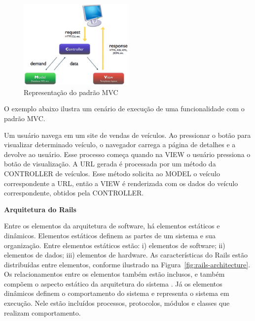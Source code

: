 \graphicspath{{figuras/}}
\begin{figure}[H]
\centering
\includegraphics[width=0.5\textwidth]{mvc}
\caption{Representação do padrão MVC}
\label{fig:mvc}
\end{figure}

O exemplo abaixo ilustra um cenário de execução de uma funcionalidade com o padrão MVC.

\begin{mdframed}[frametitle={Exemplo},roundcorner=5pt]
Um usuário navega em um site de vendas de veículos. Ao pressionar o botão para visualizar determinado veículo, o navegador carrega a página de detalhes e a devolve ao usuário. Esse processo começa quando na VIEW o usuário pressiona o botão de visualização. A URL gerada é processada por um método da CONTROLLER de veículos. Esse método solicita ao MODEL o veículo correspondente a URL, então a VIEW é renderizada com os dados do veículo correspondente, obtidos pela CONTROLLER.
\end{mdframed}



\textbf{Arquitetura do Rails}

Entre os elementos da arquitetura de software, há elementos estáticos e dinâmicos. Elementos estáticos definem as partes de um sistema e sua organização. Entre elementos estáticos estão: i) elementos de software; ii) elementos de dados; iii) elementos de hardware. 
%
As características do Rails estão distribuídas entre elementos, conforme ilustrado na Figura~\ref{fig:rails-architecture}.
%
Os relacionamentos entre os elementos também estão inclusos, e também compõem o aspecto estático da arquitetura do sistema \cite{germoglio2010fundamentos}.
%
Já os elementos dinâmicos definem o comportamento do sistema e representa o sistema em execução. Nele estão incluídos processos, protocolos, módulos e classes que realizam comportamento.

